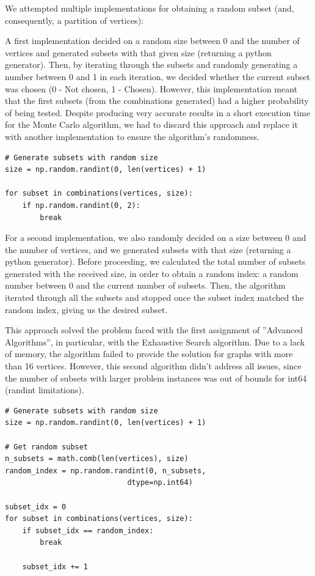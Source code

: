 \documentclass[]{revdetua}
\begin{document}
We attempted multiple implementations for obtaining a random subset  (and, consequently, a partition of vertices):

A first implementation decided on a random size between 0 and the number of vertices and generated subsets with that given size (returning a python generator). Then, by iterating through the subsets and randomly generating a number between 0 and 1 in each iteration, we decided whether the current subset was chosen (0 - Not chosen, 1 - Chosen). However, this implementation meant that the first subsets (from the combinations generated) had a higher probability of being tested. Despite producing very accurate results in a short execution time for the Monte Carlo algorithm, we had to discard this approach and replace it with another implementation to ensure the algorithm's randomness.

\pagebreak

\begin{verbatim}
# Generate subsets with random size
size = np.random.randint(0, len(vertices) + 1)

for subset in combinations(vertices, size):
    if np.random.randint(0, 2):
        break
\end{verbatim}

For a second implementation, we also randomly decided on a size between 0 and the number of vertices, and we generated subsets with that size (returning a python generator). Before proceeding, we calculated the total number of subsets generated with the received size, in order to obtain a random index: a random number between 0 and the current number of subsets. Then, the algorithm iterated through all the subsets and stopped once the subset index matched the random index, giving us the desired subset. 

This approach solved the problem faced with the first assignment of ”Advanced Algorithms”, in particular, with the Exhaustive Search algorithm. Due to a lack of memory, the algorithm failed to provide the solution for graphs with more than 16 vertices. However, this second algorithm didn't address all issues, since the number of subsets with larger problem instances was out of bounds for int64 (randint limitations).

\begin{verbatim}
# Generate subsets with random size
size = np.random.randint(0, len(vertices) + 1)

# Get random subset
n_subsets = math.comb(len(vertices), size)
random_index = np.random.randint(0, n_subsets, 
                            dtype=np.int64)

subset_idx = 0
for subset in combinations(vertices, size):
    if subset_idx == random_index:
        break

    subset_idx += 1
\end{verbatim}
\end{document}
